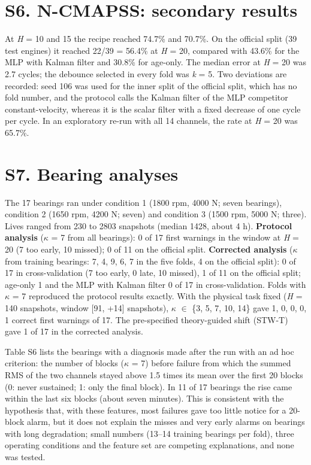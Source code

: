 \documentclass[11pt,a4paper]{article}
\begin{document}
\section*{S6. N-CMAPSS: secondary results}

\noindent At \textit{H} = 10 and 15 the recipe reached 74.7\% and 70.7\%. On the official split (39 test engines) it reached 22/39 = 56.4\% at \textit{H} = 20, compared with 43.6\% for the MLP with Kalman filter and 30.8\% for age-only. The median error at \textit{H} = 20 was \textminus{}2.7 cycles; the debounce selected in every fold was \textit{k} = 5. Two deviations are recorded: seed 106 was used for the inner split of the official split, which has no fold number, and the protocol calls the Kalman filter of the MLP competitor constant-velocity, whereas it is the scalar filter with a fixed decrease of one cycle per cycle. In an exploratory re-run with all 14 channels, the rate at \textit{H} = 20 was 65.7\%.

\section*{S7. Bearing analyses}

\noindent The 17 bearings ran under condition 1 (1800 rpm, 4000 N; seven bearings), condition 2 (1650 rpm, 4200 N; seven) and condition 3 (1500 rpm, 5000 N; three). Lives ranged from 230 to 2803 snapshots (median 1428, about 4 h). \textbf{Protocol analysis} ($\kappa$ = 7 from all bearings): 0 of 17 first warnings in the window at \textit{H} = 20 (7 too early, 10 missed); 0 of 11 on the official split. \textbf{Corrected analysis} ($\kappa$ from training bearings: 7, 4, 9, 6, 7 in the five folds, 4 on the official split): 0 of 17 in cross-validation (7 too early, 0 late, 10 missed), 1 of 11 on the official split; age-only 1 and the MLP with Kalman filter 0 of 17 in cross-validation. Folds with $\kappa$ = 7 reproduced the protocol results exactly. With the physical task fixed (\textit{H} = 140 snapshots, window [\textminus{}91, +14] snapshots), $\kappa$ $\in$ \{3, 5, 7, 10, 14\} gave 1, 0, 0, 0, 1 correct first warnings of 17. The pre-specified theory-guided shift (STW-T) gave 1 of 17 in the corrected analysis.

\noindent Table S6 lists the bearings with a diagnosis made after the run with an ad hoc criterion: the number of blocks ($\kappa$ = 7) before failure from which the summed RMS of the two channels stayed above 1.5 times its mean over the first 20 blocks (0: never sustained; 1: only the final block). In 11 of 17 bearings the rise came within the last six blocks (about seven minutes). This is consistent with the hypothesis that, with these features, most failures gave too little notice for a 20-block alarm, but it does not explain the misses and very early alarms on bearings with long degradation; small numbers (13--14 training bearings per fold), three operating conditions and the feature set are competing explanations, and none was tested.
\end{document}
